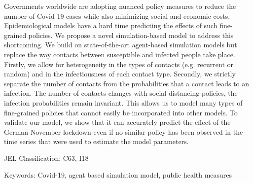 \noindent Governments worldwide are adopting nuanced policy measures to reduce the number of Covid-19 cases while also  minimizing social and economic costs. Epidemiological models have a hard time predicting the effects of such fine-grained policies. We propose a novel simulation-based model to address this shortcoming. We build on state-of-the-art agent-based simulation models but replace the way contacts between susceptible and infected people take place. Firstly, we allow for heterogeneity in the types of contacts (e.g. recurrent or random) and in the infectiousness of each contact type. Secondly, we strictly separate the number of contacts from the probabilities that a contact leads to an infection. The number of contacts changes with social distancing policies, the infection probabilities remain invariant. This allows us to model many types of fine-grained policies that cannot easily be incorporated into other models. To validate our model, we show that it can accurately predict the effect of the German November lockdown even if no similar policy has been observed in the time series that were used to estimate the model parameters.

\vspace{1cm}
\noindent JEL Classification: C63, I18

\noindent Keywords: Covid-19, agent based simulation model, public health measures
